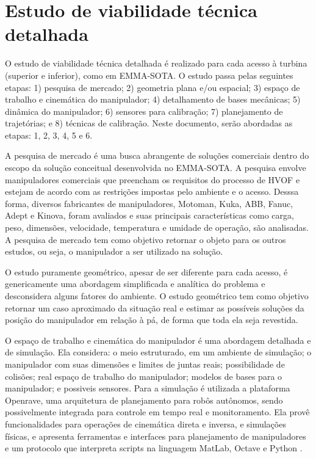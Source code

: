 \section{Estudo de viabilidade técnica detalhada}\label{sec::viatec}
O estudo de viabilidade técnica detalhada é realizado para cada acesso à turbina
(superior e inferior), como em EMMA-SOTA. O estudo passa pelas
seguintes etapas: 1) pesquisa de mercado; 2) geometria plana e/ou espacial; 3)
espaço de trabalho e cinemática do manipulador; 4) detalhamento de
bases mecânicas; 5) dinâmica do manipulador; 6) sensores para calibração; 7)
planejamento de trajetórias; e 8) técnicas de calibração.
Neste documento, serão abordadas as etapas: 1, 2, 3, 4, 5 e 6.

A pesquisa de mercado é uma busca abrangente de soluções comerciais dentro do
escopo da solução conceitual desenvolvida no EMMA-SOTA. A pesquisa envolve
manipuladores comerciais que preencham os requisitos do processo de HVOF e
estejam de acordo com as restrições impostas pelo ambiente e o acesso. Desssa
forma, diversos fabricantes de manipuladores, Motoman, Kuka, ABB, Fanuc,
Adept e Kinova, foram avaliados e suas principais características como carga,
peso, dimensões, velocidade, temperatura e umidade de operação, são analisadas.
A pesquisa de mercado tem como objetivo retornar o objeto para os outros
estudos, ou seja, o manipulador a ser utilizado na solução.

O estudo puramente geométrico, apesar de ser diferente para cada acesso, é
genericamente uma abordagem simplificada e analítica do problema e desconsidera
alguns fatores do ambiente. O estudo geométrico tem como objetivo retornar um caso
aproximado da situação real e estimar as possíveis soluções da posição do
manipulador em relação à pá, de forma que toda ela seja revestida.

O espaço de trabalho e cinemática do manipulador é uma abordagem
detalhada e de simulação. Ela considera: o meio estruturado, em um ambiente de
simulação; o manipulador com suas dimensões e limites de juntas reais;
possibilidade de colisões; real espaço de trabalho do manipulador; modelos de
bases para o manipulador; e possiveis sensores. Para a simulação é utilizada a
plataforma Openrave, uma arquitetura de planejamento para robôs autônomos,
sendo possivelmente integrada para controle em tempo real e monitoramento.
Ela provê funcionalidades para operações de cinemática direta e inversa, e
simulações físicas, e apresenta ferramentas e interfaces para planejamento de
manipuladores e um protocolo que interpreta scripts na linguagem MatLab, Octave
e Python \citep{diankov2008openrave}.

